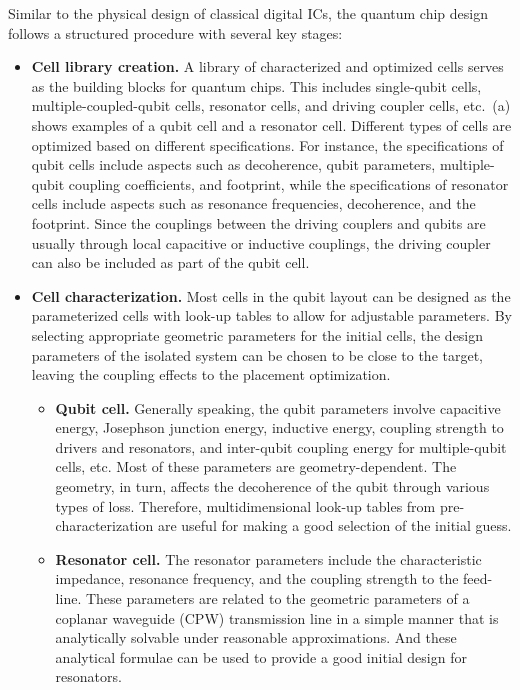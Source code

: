 \documentclass[a4paper,onecolumn,11pt,unpublished]{quantumarticle}
\begin{document}
Similar to the physical design of classical digital ICs, the quantum chip design follows a structured procedure with several key stages:
\begin{itemize}
    \item \textbf{Cell library creation.}  A library of characterized and optimized cells serves as the building blocks for quantum chips. This includes single-qubit cells, multiple-coupled-qubit cells, resonator cells, and driving coupler cells, etc.~(a) shows examples of a qubit cell and a resonator cell. Different types of cells are optimized based on different specifications. For instance, the specifications of qubit cells include aspects such as decoherence, qubit parameters, multiple-qubit coupling coefficients, and footprint, while the specifications of resonator cells include aspects such as resonance frequencies, decoherence, and the footprint. Since the couplings between the driving couplers and qubits are usually through local capacitive or inductive couplings, the driving coupler can also be included as part of the qubit cell.
    \item \textbf{Cell characterization.} Most cells in the qubit layout can be designed as the parameterized cells with look-up tables to allow for adjustable parameters. By selecting appropriate geometric parameters for the initial cells, the design parameters of the isolated system can be chosen to be close to the target, leaving the coupling effects to the placement optimization.   
    \begin{itemize}
        \item \textbf{Qubit cell.} Generally speaking, the qubit parameters involve capacitive energy, Josephson junction energy, inductive energy, coupling strength to drivers and resonators, and inter-qubit coupling energy for multiple-qubit cells, etc. Most of these parameters are geometry-dependent. The geometry, in turn, affects the decoherence of the qubit through various types of loss. Therefore, multidimensional look-up tables from pre-characterization are useful for making a good selection of the initial guess.  
        \item \textbf{Resonator cell.} The resonator parameters include the characteristic impedance, resonance frequency, and the coupling strength to the feed-line. These parameters are related to the geometric parameters of a coplanar waveguide (CPW) transmission line in a simple manner that is analytically solvable under reasonable approximations. And these analytical formulae can be used to provide a good initial design for resonators. 

\end{itemize}
\end{itemize}
\end{document}
